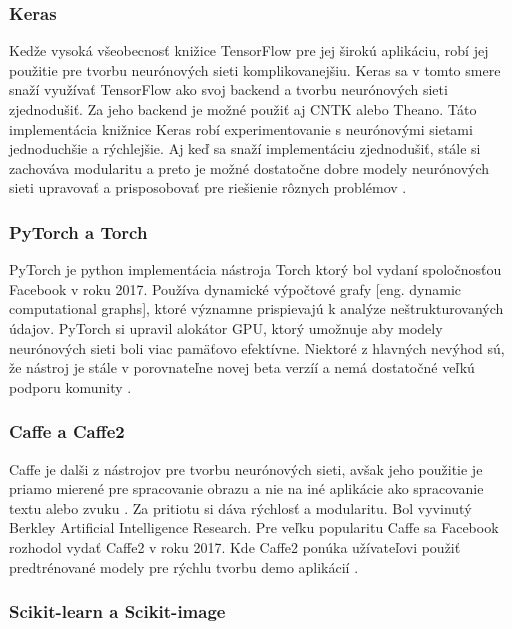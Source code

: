\subsubsection{Keras}

Kedže vysoká všeobecnosť knižice TensorFlow pre jej širokú aplikáciu, robí jej použitie pre tvorbu neurónových sieti komplikovanejšiu.
Keras sa v tomto smere snaží využívať TensorFlow ako svoj backend a tvorbu neurónových sieti zjednodušiť.
Za jeho backend je možné použiť aj CNTK alebo Theano.
Táto implementácia knižnice Keras robí experimentovanie s neurónovými sietami jednoduchšie a rýchlejšie.
Aj keď sa snaží implementáciu zjednodušiť, stále si zachováva modularitu a preto je možné dostatočne dobre modely neurónových sieti upravovať a prisposobovať pre riešienie rôznych problémov \cite{odkaz:Keras}.

\subsubsection{PyTorch a Torch}

PyTorch je python implementácia nástroja Torch ktorý bol vydaní spoločnosťou Facebook v roku 2017.
Používa dynamické výpočtové grafy [eng. dynamic computational graphs], ktoré významne prispievajú k analýze neštrukturovaných údajov.
PyTorch si upravil alokátor GPU, ktorý umožnuje aby modely neurónových sieti boli viac pamäťovo efektívne.
Niektoré z hlavných nevýhod sú, že nástroj je stále v porovnateľne novej beta verzíí a nemá dostatočné veľkú podporu komunity \cite{odkaz:FrameworkComparison}.

\subsubsection{Caffe a Caffe2}

Caffe je dalši z nástrojov pre tvorbu neurónových sieti, avšak jeho použitie je priamo mierené pre spracovanie obrazu a nie na iné aplikácie
    ako spracovanie textu alebo zvuku \cite{odkaz:FrameworkComparison2}.
Za pritiotu si dáva rýchlosť a modularitu. Bol vyvinutý Berkley Artificial Intelligence Research.
Pre veľku popularitu Caffe sa Facebook rozhodol vydať Caffe2 v roku 2017.
Kde Caffe2 ponúka užívateľovi použiť predtrénované modely pre rýchlu tvorbu demo aplikácií \cite{odkaz:FrameworkComparison}.

\subsubsection{Scikit-learn a Scikit-image}

